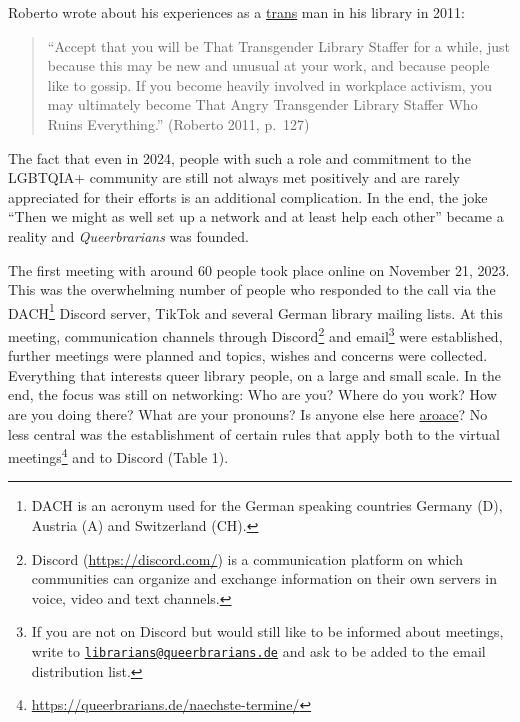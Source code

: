 \documentclass[a4paper,
fontsize=11pt,
oneside,
numbers=noperiodatend,
parskip=half-,
bibliography=totoc,
final
]{scrartcl}
\begin{document}
Roberto wrote about his experiences as a
\href{https://lgbtqia.fandom.com/wiki/Transgender}{trans} man in his
library in 2011:

\begin{quote}
\enquote{Accept that you will be That Transgender Library Staffer for a while,
just because this may be new and unusual at your work, and because
people like to gossip. If you become heavily involved in workplace
activism, you may ultimately become That Angry Transgender Library
Staffer Who Ruins Everything.} (Roberto 2011, p.~127)
\end{quote}

The fact that even in 2024, people with such a role and commitment to
the LGBTQIA+ community are still not always met positively and are
rarely appreciated for their efforts is an additional complication. In
the end, the joke \enquote{Then we might as well set up a network and at least
help each other} became a reality and \emph{Queerbrarians} was founded.

The first meeting with around 60 people took place online on November
21, 2023. This was the overwhelming number of people who responded to
the call via the DACH\footnote{DACH is an acronym used for the German
  speaking countries Germany (D), Austria (A) and Switzerland (CH).}
Discord server, TikTok and several German library mailing lists. At this
meeting, communication channels through Discord\footnote{Discord
  (\url{https://discord.com/}) is a communication platform on which
  communities can organize and exchange information on their own servers
  in voice, video and text channels.} and email\footnote{If you are not
  on Discord but would still like to be informed about meetings, write
  to
  \href{mailto:librarians@queerbrarians.de}{\nolinkurl{librarians@queerbrarians.de}}
  and ask to be added to the email distribution list.} were established,
further meetings were planned and topics, wishes and concerns were
collected. Everything that interests queer library people, on a large
and small scale. In the end, the focus was still on networking: Who are
you? Where do you work? How are you doing there? What are your pronouns?
Is anyone else here
\href{https://lgbtqia.mywikis.wiki/wiki/Aroace}{aroace}? No less central
was the establishment of certain rules that apply both to the virtual
meetings\footnote{\url{https://queerbrarians.de/naechste-termine/}} and
to Discord (Table 1).
\end{document}
